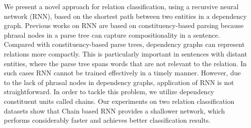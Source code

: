 We present a novel approach for relation classification, using a recursive neural network (RNN), based on the shortest path between two entities in a dependency graph. Previous works on RNN are based on constituency-based parsing because phrasal nodes in a parse tree can capture compositionality in a sentence. Compared with constituency-based parse trees, dependency graphs can represent relations more compactly. This is particularly important in sentences with distant entities, where the parse tree spans words that are not relevant to the relation. In such cases RNN cannot be trained effectively in a timely manner. However, due to the lack of phrasal nodes in dependency graphs, application of RNN is not straightforward. In order to tackle this problem, we utilize dependency constituent units called chains. Our experiments on two relation classification datasets show that Chain based RNN provides a shallower network, which performs considerably faster and achieves better classification results.
